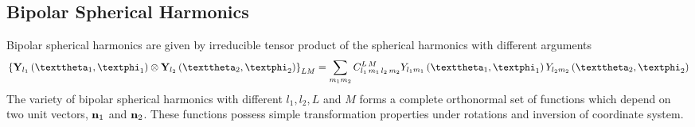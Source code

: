\subsection{Bipolar Spherical Harmonics}\label{sec:5.16.1}
Bipolar spherical harmonics are given by irreducible tensor product of the spherical harmonics with different arguments
\begin{equation}
\left\{\vect{Y}_{l_{1}}\left(\vartheta_{1}, \varphi_{1}\right) \otimes \vect{Y}_{l_{2}}\left(\vartheta_{2}, \varphi_{2}\right)\right\}_{L M}=\sum_{m_{1} m_{2}} \clebsch{l_{1}}{m_{1}}{l_{2}}{m_{2}}{L}{M} Y_{l_{1} m_{1}}\left(\vartheta_{1}, \varphi_{1}\right) Y_{l_{2} m_{2}}\left(\vartheta_{2}, \varphi_{2}\right) \label{eq:5:16:1}
\end{equation}
The variety of bipolar spherical harmonics with different $l_{1}, l_{2}, L$ and $M$ forms a complete orthonormal set of functions which depend on two unit vectors, $\mathbf{n}_{1}$ and $\mathbf{n}_{2}$. These functions possess simple transformation properties under rotations and inversion of coordinate system.

